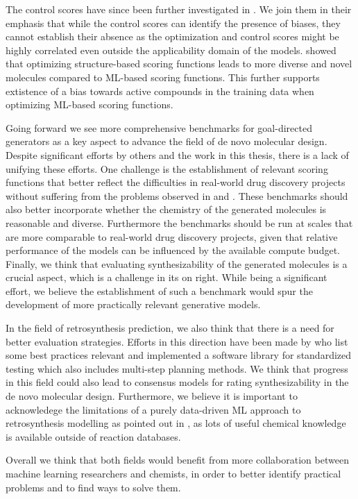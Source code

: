 The control scores have since been further investigated in \citep{turkMolecularAssaysSimulator2022}.
We join them in their emphasis that while the control scores can identify the presence of biases,
they cannot establish their absence as the optimization and control scores might be highly
correlated even outside the applicability domain of the models.
\citet{thomasComparisonStructureLigandbased2021} showed that optimizing structure-based scoring
functions leads to more diverse and novel molecules compared to \ac{ML}-based scoring functions.
This further supports extistence of a bias towards active compounds in the training data when
optimizing \ac{ML}-based scoring functions.

Going forward we see more comprehensive benchmarks for goal-directed generators as a key aspect to
advance the field of de novo molecular design. Despite significant efforts by others
\citep{brownGuacaMolBenchmarkingModels2019,gaoSampleEfficiencyMatters2022,gaoSynthesizabilityMoleculesProposed2020,thomasMolScoreScoringEvaluation2024}
and the work in this thesis, there is a lack of unifying these efforts. One challenge is the
establishment of relevant scoring functions that better reflect the difficulties in real-world drug
discovery projects \citep{fromerComputeraidedMultiobjectiveOptimization2023} without suffering from
the problems observed in  and \citep{lyuModelingExpansionVirtual2023}. These
benchmarks should also better incorporate whether the chemistry of the generated molecules is
reasonable \citep{thomasReevaluatingSampleEfficiency2022} and diverse. Furthermore the benchmarks
should be run at scales that are more comparable to real-world drug discovery projects, given that
relative performance of the models can be influenced by the available compute budget. Finally, we
think that evaluating synthesizability of the generated molecules is a crucial aspect, which is a
challenge in its on right. While being a significant effort, we believe the establishment of such a
benchmark would spur the development of more practically relevant generative models.

In the field of retrosynthesis prediction, we also think that there is a need for better evaluation
strategies. Efforts in this direction have been made by
\citet{maziarzReevaluatingRetrosynthesisAlgorithms2024a} who list some best practices relevant and
implemented a software library for standardized testing which also includes multi-step planning
methods. We think that progress in this field could also lead to consensus models for rating
synthesizability in the de novo molecular design. Furthermore, we believe it is important to
acknowledege the limitations of a purely data-driven ML approach to retrosynthesis modelling as
pointed out in \citep{strieth-kalthoffArtificialIntelligenceRetrosynthetic2024}, as lots of useful
chemical knowledge is available outside of reaction databases.

Overall we think that both fields would benefit from more collaboration between machine learning
researchers and chemists, in order to better identify practical problems
\citep{benderArtificialIntelligenceDrug2021} and to find ways to solve them.


